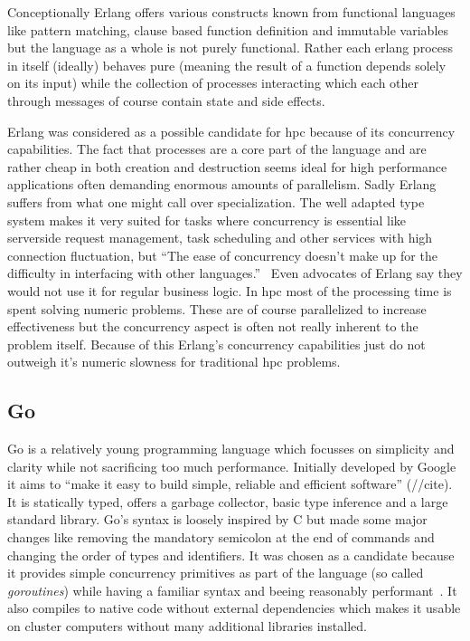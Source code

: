 Conceptionally Erlang offers various constructs known from functional languages like pattern matching, clause based function definition and immutable variables but the language as a whole is not purely functional. Rather each erlang process in itself (ideally) behaves pure (meaning the result of a function depends solely on its input) while the collection of processes interacting which each other through messages of course contain state and side effects.

Erlang was considered as a possible candidate for \gls{hpc} because of its concurrency capabilities. The fact that processes are a core part of the language and are rather cheap in both creation and destruction seems ideal for high performance applications often demanding enormous amounts of parallelism. Sadly Erlang suffers from what one might call over specialization. The well adapted type system makes it very suited for tasks where concurrency is essential like serverside request management, task scheduling and other services with high connection fluctuation, but ``The ease of concurrency doesn’t make up for the difficulty in interfacing with other languages.''~\cite{erlang_fps} Even advocates of Erlang say they would not use it for regular business logic. In \gls{hpc} most of the processing time is spent solving numeric problems. These are of course parallelized to increase effectiveness but the concurrency aspect is often not really inherent to the problem itself. Because of this Erlang's concurrency capabilities just do not outweigh it's numeric slowness for traditional \gls{hpc} problems.~\cite{erlang_guide}

%
%


\subsection*{Go}
\label{subsec:State_of_the_art::Candidates::Go}

Go is a relatively young programming language which focusses on simplicity and clarity while not sacrificing too much performance. Initially developed by Google it aims to ``make it easy to build simple, reliable and efficient software'' (//cite). It is statically typed, offers a garbage collector, basic type inference and a large standard library. Go's syntax is loosely inspired by C but made some major changes like removing the mandatory semicolon at the end of commands and changing the order of types and identifiers. It was chosen as a candidate because it provides simple concurrency primitives as part of the language (so called \textit{goroutines}) while having a familiar syntax and beeing reasonably performant~\cite{intro_go}. It also compiles to native code without external dependencies which makes it usable on cluster computers without many additional libraries installed.

